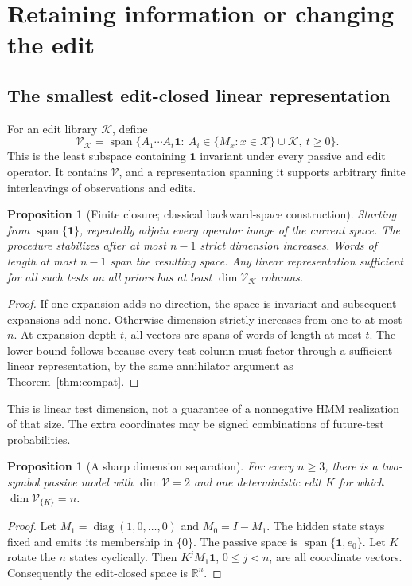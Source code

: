 \documentclass[11pt,letterpaper]{article}
\newtheorem{proposition}[theorem]{Proposition}
\newcommand{\one}{\mathbf{1}}
\newcommand{\spn}{\operatorname{span}}
\newcommand{\Kset}{\mathcal{K}}
\newcommand{\V}{\mathcal{V}}
\begin{document}
\section{Retaining information or changing the edit}
\subsection{The smallest edit-closed linear representation}
For an edit library $\Kset$, define
\begin{equation}
\V_{\Kset}=\spn\{A_1\cdots A_t\one:\ A_i\in\{M_x:x\in\mathcal X\}\cup\Kset,\ t\ge0\}.
\end{equation}
This is the least subspace containing $\one$ invariant under every passive and edit operator. It contains $\V$, and a representation spanning it supports arbitrary finite interleavings of observations and edits.

\begin{proposition}[Finite closure; classical backward-space construction]\label{prop:closure}
Starting from $\spn\{\one\}$, repeatedly adjoin every operator image of the current space. The procedure stabilizes after at most $n-1$ strict dimension increases. Words of length at most $n-1$ span the resulting space. Any linear representation sufficient for all such tests on all priors has at least $\dim\V_{\Kset}$ columns.
\end{proposition}
\begin{proof}
If one expansion adds no direction, the space is invariant and subsequent expansions add none. Otherwise dimension strictly increases from one to at most $n$. At expansion depth $t$, all vectors are spans of words of length at most $t$. The lower bound follows because every test column must factor through a sufficient linear representation, by the same annihilator argument as Theorem~\ref{thm:compat}.
\end{proof}
This is linear test dimension, not a guarantee of a nonnegative HMM realization of that size. The extra coordinates may be signed combinations of future-test probabilities.

\begin{proposition}[A sharp dimension separation]\label{prop:cycle}
For every $n\ge3$, there is a two-symbol passive model with $\dim\V=2$ and one deterministic edit $K$ for which $\dim\V_{\{K\}}=n$.
\end{proposition}
\begin{proof}
Let $M_1=\operatorname{diag}(1,0,\ldots,0)$ and $M_0=I-M_1$. The hidden state stays fixed and emits its membership in $\{0\}$. The passive space is $\spn\{\one,e_0\}$. Let $K$ rotate the $n$ states cyclically. Then $K^jM_1\one$, $0\le j<n$, are all coordinate vectors. Consequently the edit-closed space is $\mathbb R^n$.
\end{proof}
\end{document}
